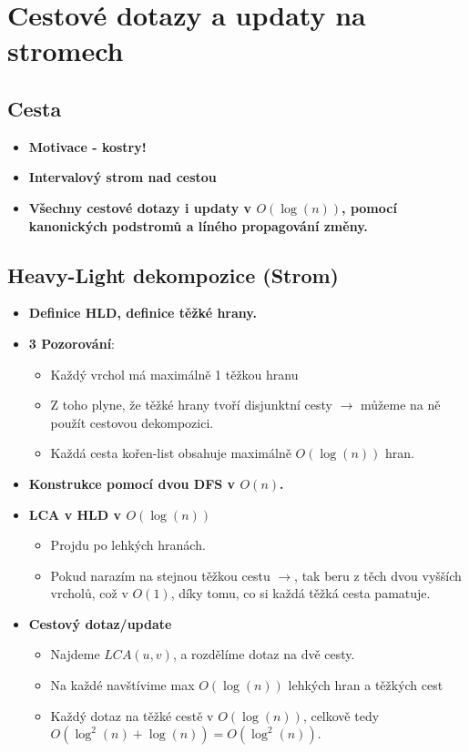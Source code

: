 \documentclass[11pt,a4paper]{article}
\begin{document}
\section{Cestové dotazy a updaty na stromech}
    \subsection{Cesta}
    \begin{itemize}
        \item \textbf{Motivace - kostry!}
        \item \textbf{Intervalový strom nad cestou}
        \item \textbf{Všechny cestové dotazy i updaty v $O(\log(n))$, pomocí kanonických podstromů a líného propagování změny.}
    \end{itemize}
    \subsection{Heavy-Light dekompozice (Strom)}
    \begin{itemize}
        \item \textbf{Definice HLD, definice těžké hrany.}
        \item \textbf{3 Pozorování}:
        \begin{itemize}
            \item Každý vrchol má maximálně 1 těžkou hranu
            \item Z toho plyne, že těžké hrany tvoří disjunktní cesty $\rightarrow$ můžeme na ně použít cestovou dekompozici.
            \item Každá cesta kořen-list obsahuje maximálně $O(\log(n))$ hran.
        \end{itemize}
        \item \textbf{Konstrukce pomocí dvou DFS v $O(n)$.}
        \item \textbf{LCA v HLD v $O(\log(n))$}
        \begin{itemize}
            \item Projdu po lehkých hranách.
            \item Pokud narazím na stejnou těžkou cestu $\rightarrow$, tak beru z těch dvou vyšších vrcholů, což v $O(1)$, díky tomu, co si každá těžká cesta pamatuje.
        \end{itemize}
        \item \textbf{Cestový dotaz/update}
        \begin{itemize}
            \item Najdeme $LCA(u,v)$, a rozdělíme dotaz na dvě cesty.
            \item Na každé navštívime max $O(\log(n))$ lehkých hran a těžkých cest
            \item Každý dotaz na těžké cestě v $O(\log(n))$, celkově tedy $O(\log^2(n) + \log(n)) = O(\log^2(n))$.
        \end{itemize}
    \end{itemize}
\end{document}
